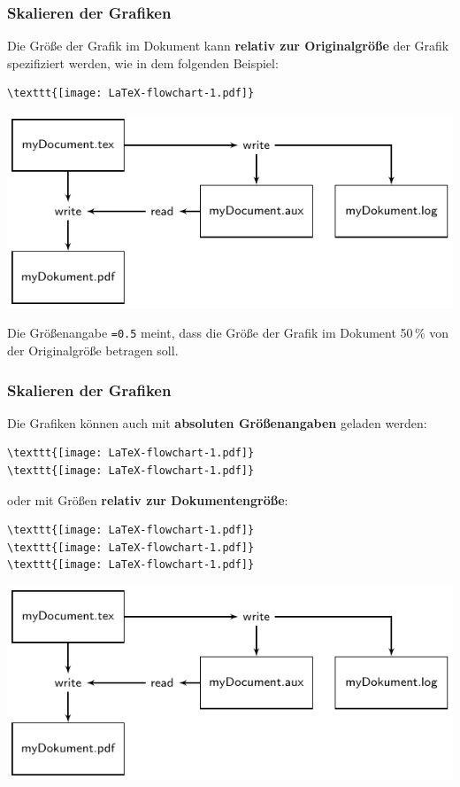 \begin{frame}[fragile]
\frametitle{Skalieren der Grafiken}

Die Größe der Grafik im Dokument kann \textbf{relativ zur Originalgröße} der Grafik spezifiziert werden, wie in dem folgenden Beispiel:

\begin{lstlisting}
\texttt{[image: LaTeX-flowchart-1.pdf]}  
\end{lstlisting}

\includegraphics[scale=0.5]{../../texfiles-beamer/tex-material/WissArb-latex/LaTeX-flowchart-1.pdf}

\noindent Die Größenangabe \texttt{=0.5} meint, dass die Größe der Grafik im Dokument 50\,\% von der Originalgröße betragen soll.\par

\end{frame}


\begin{frame}[fragile]
\frametitle{Skalieren der Grafiken}

Die Grafiken können auch mit \textbf{absoluten Größenangaben} geladen werden:

\begin{lstlisting}
\texttt{[image: LaTeX-flowchart-1.pdf]}
\texttt{[image: LaTeX-flowchart-1.pdf]}
\end{lstlisting}

oder mit Größen \textbf{relativ zur Dokumentengröße}:

\begin{lstlisting}
\texttt{[image: LaTeX-flowchart-1.pdf]}  
\texttt{[image: LaTeX-flowchart-1.pdf]}
\texttt{[image: LaTeX-flowchart-1.pdf]}
\end{lstlisting}


\includegraphics[width=.2\linewidth]{../../texfiles-beamer/tex-material/WissArb-latex/LaTeX-flowchart-1}
\end{frame}


